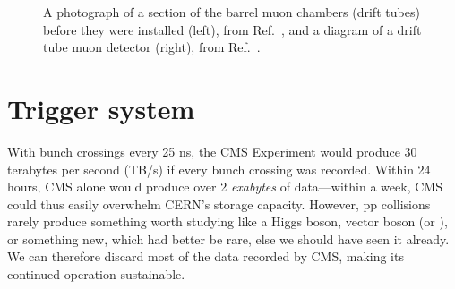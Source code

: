 \begin{figure}[htb]
    \centering
    \quad
    \caption[A photograph of a section of the barrel muon chambers and a diagram of a drift tube muon detector]{
        A photograph of a section of the barrel muon chambers (drift tubes) before they were installed (left), from Ref.~\cite{Hoch:1274451}, and a diagram of a drift tube muon detector (right), from Ref.~\cite{CMSWebMuonDT}. 
    }
    \label{fig:cms_muon_DT}
\end{figure}

\section{Trigger system}
With bunch crossings every 25 ns, the CMS Experiment would produce 30 terabytes per second (TB/s) if every bunch crossing was recorded. 
Within 24 hours, CMS alone would produce over 2 \textit{exabytes} of data---within a week, CMS could thus easily overwhelm CERN's storage capacity. 
However, pp collisions rarely produce something worth studying like a Higgs boson, vector boson (\PW or \PZ), or something new, which had better be rare, else we should have seen it already. 
We can therefore discard most of the data recorded by CMS, making its continued operation sustainable. 

